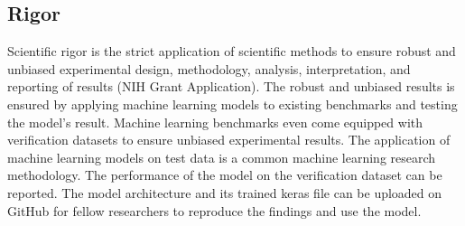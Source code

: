 \subsection{Rigor}

Scientific rigor is the strict application of scientific methods to ensure robust and unbiased experimental design, methodology, analysis, interpretation, and reporting of results (NIH Grant Application).  The robust and unbiased results is ensured by applying machine learning models to existing benchmarks and testing the model's result.  Machine learning benchmarks even come equipped with verification datasets to ensure unbiased experimental results.  The application of machine learning models on test data is a common machine learning research methodology.  The performance of the model on the verification dataset can be reported.  The model architecture and its trained keras file can be uploaded on GitHub for fellow researchers to reproduce the findings and use the model.  

